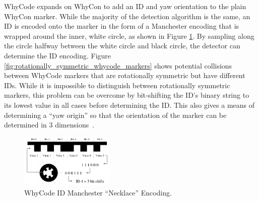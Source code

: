 WhyCode expands on WhyCon to add an ID and yaw orientation to the plain WhyCon marker.
While the majority of the detection algorithm is the same,
an ID is encoded onto the marker in the form of a Manchester encoding that is wrapped around the inner, white circle,
as shown in Figure \ref{fig:whycode_id}.
By sampling along the circle halfway between the white circle and black circle, the detector can determine the ID encoding.
Figure \ref{fig:rotationally_symmetric_whycode_markers} shows potential collisions between WhyCode markers that are
rotationally symmetric but have different IDs.
While it is impossible to distinguish between rotationally symmetric markers, this problem can be overcome by bit-shifting
the ID's binary string to its lowest value in all cases before determining the ID.
This also gives a means of determining a ``yaw origin'' so that the orientation of the marker can be determined in 3 dimensions~\cite{whycode_paper}.

\begin{figure}
    \centering
    \includegraphics[width=0.4\textwidth]{images/whycode_manchester_explanation.png}
    \caption{WhyCode ID Manchester ``Necklace'' Encoding.}
    \label{fig:whycode_id}
\end{figure}

